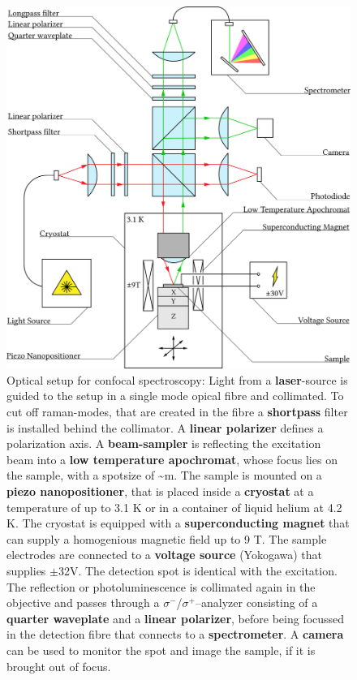 \begin{figure}
	\centering
	\includegraphics[width=.8\textwidth]{OptischerAufbau.png}
	\caption{Optical setup for confocal spectroscopy: Light from a \textbf{laser}-source is guided to the setup in a single mode opical fibre and collimated. To cut off raman-modes, that are created in the fibre a \textbf{shortpass} filter is installed behind the collimator. A \textbf{linear polarizer} defines a polarization axis. A \textbf{beam-sampler} is reflecting the excitation beam into a \textbf{low temperature apochromat}, whose focus lies on the sample, with a spotsize of \textasciitilde{}\mu m. The sample is mounted on a \textbf{piezo nanopositioner}, that is placed inside a \textbf{cryostat} at a temperature of up to 3.1 K or in a container of liquid helium at 4.2 K. The cryostat is equipped with a \textbf{superconducting magnet} that can supply a homogenious magnetic field up to 9 T. The sample electrodes are connected to a \textbf{voltage source} (Yokogawa) that supplies {\small$\pm$}32V. The detection spot is identical with the excitation. The reflection or photoluminescence is collimated again in the objective and passes through a $\sigma^-$/$\sigma^+$--analyzer consisting of a \textbf{quarter waveplate} and a \textbf{linear polarizer}, before being focussed in the detection fibre that connects to a \textbf{spectrometer}. A \textbf{camera} can be used to monitor the spot and image the sample, if it is brought out of focus.}
	\label{opticalsetup}
\end{figure}


